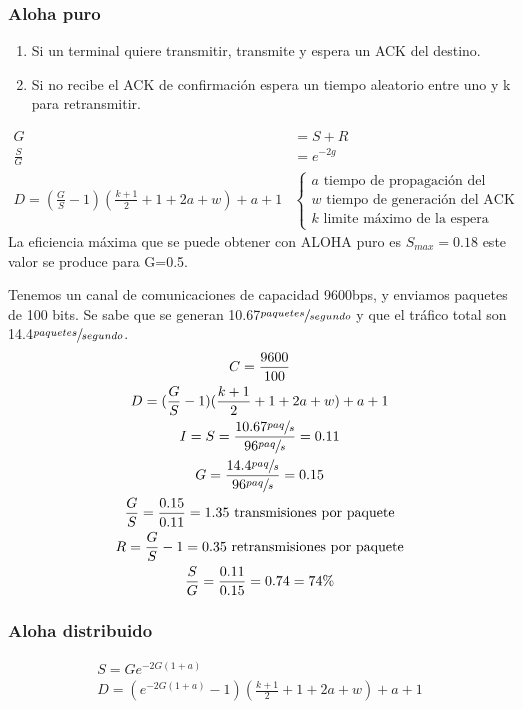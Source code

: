 \subsubsection{Aloha puro}
\begin{enumerate}
\item Si un terminal quiere transmitir, transmite y espera un ACK del destino.
\item Si no recibe el ACK de confirmación espera un tiempo aleatorio entre uno y k para retransmitir.
\end{enumerate}
\begin{align}
G&=S+R\\
\frac{S}{G}&=e^{-2g}\\
D=(\frac{G}{S}-1)(\frac{k+1}{2}+1+2a+w)+a+1 &
\begin{cases}
a\text{ tiempo de propagación del paquete}\\
w\text{ tiempo de generación del ACK}\\
k\text{ limite máximo de la espera}
\end{cases}
\end{align}
La eficiencia máxima que se puede obtener con ALOHA puro es $S_{max}=0.18$ este valor se produce para G=0.5.\\
\begin{example}
Tenemos un canal de comunicaciones de capacidad 9600bps, y enviamos paquetes de 100 bits. Se sabe que se generan 10.67$\sfrac{paquetes}{segundo}$ y que el tráfico total son 14.4$\sfrac{paquetes}{segundo}$.
\begin{gather*}
C=\frac{9600}{100}\\
D=(\frac{G}{S}-1)(\frac{k+1}{2}+1+2a+w)+a+1\\
I=S=\frac{10.67\sfrac{paq}{s}}{96\sfrac{paq}{s}}=0.11\\
G=\frac{14.4\sfrac{paq}{s}}{96\sfrac{paq}{s}}=0.15\\
\frac{G}{S}=\frac{0.15}{0.11}=1.35\text{ transmisiones por paquete}\\
R=\frac{G}{S}-1=0.35\text{ retransmisiones por paquete}\\
\frac{S}{G}=\frac{0.11}{0.15}=0.74=74\%
\end{gather*}
\end{example}
\subsubsection{Aloha distribuido}
\begin{align}
S=Ge^{-2G(1+a)}\\
D=(e^{-2G(1+a)}-1)(\frac{k+1}{2}+1+2a+w)+a+1
\end{align}
